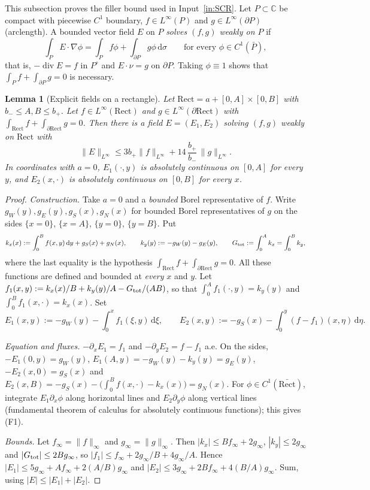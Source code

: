 \documentclass[11pt]{article}
\newtheorem{lemma}[theorem]{Lemma}
\theoremstyle{definition}
\theoremstyle{remark}
\newcommand{\C}{\mathbb C}
\newcommand{\dd}{\,\mathrm d}
\begin{document}
This subsection proves the filler bound used in Input~\ref{in:SCR}. Let $P\subset\C$ be compact
with piecewise $C^1$ boundary, $f\in L^\infty(P)$ and $g\in L^\infty(\partial P)$ (arclength). A
bounded vector field $E$ on $P$ \emph{solves $(f,g)$ weakly on $P$} if
\[
\int_PE\cdot\nabla\phi=\int_Pf\phi+\int_{\partial P}g\phi\dd\sigma\qquad\text{for every }\phi\in C^1(\bar P),
\tag{F1}
\]
that is, $-\operatorname{div}E=f$ in $P^\circ$ and $E\cdot\nu=g$ on $\partial P$. Taking $\phi\equiv1$
shows that $\int_Pf+\int_{\partial P}g=0$ is necessary.

\begin{lemma}[Explicit fields on a rectangle]\label{lem:rectfield}
Let $\mathrm{Rect}=a+[0,A]\times[0,B]$ with $b_-\le A,B\le b_+$. Let $f\in L^\infty(\mathrm{Rect})$ and
$g\in L^\infty(\partial\mathrm{Rect})$ with $\int_{\mathrm{Rect}}f+\int_{\partial\mathrm{Rect}}g=0$. Then there is a field
$E=(E_1,E_2)$ solving $(f,g)$ weakly on $\mathrm{Rect}$ with
\[
\|E\|_{L^\infty}\le3b_+\|f\|_{L^\infty}+14\,\frac{b_+}{b_-}\,\|g\|_{L^\infty}.
\]
In coordinates with $a=0$, $E_1(\cdot,y)$ is absolutely continuous on $[0,A]$ for every $y$, and
$E_2(x,\cdot)$ is absolutely continuous on $[0,B]$ for every $x$.
\end{lemma}
\begin{proof}
\emph{Construction.} Take $a=0$ and a \emph{bounded} Borel representative of $f$. Write
$g_W(y),g_E(y),g_S(x),g_N(x)$ for bounded Borel representatives of $g$ on the sides $\{x=0\}$,
$\{x=A\}$, $\{y=0\}$, $\{y=B\}$. Put
\[
k_x(x):=\int_0^Bf(x,y)\dd y+g_S(x)+g_N(x),\qquad k_y(y):=-g_W(y)-g_E(y),\qquad
G_{\rm tot}:=\int_0^Ak_x=\int_0^Bk_y ,
\]
where the last equality is the hypothesis $\int_{\mathrm{Rect}}f+\int_{\partial\mathrm{Rect}}g=0$. All these
functions are defined and bounded at \emph{every} $x$ and $y$. Let
$f_1(x,y):=k_x(x)/B+k_y(y)/A-G_{\rm tot}/(AB)$, so that $\int_0^Af_1(\cdot,y)=k_y(y)$ and
$\int_0^Bf_1(x,\cdot)=k_x(x)$. Set
\[
E_1(x,y):=-g_W(y)-\int_0^xf_1(\xi,y)\dd\xi,\qquad
E_2(x,y):=-g_S(x)-\int_0^y(f-f_1)(x,\eta)\dd\eta .
\]

\emph{Equation and fluxes.} $-\partial_xE_1=f_1$ and $-\partial_yE_2=f-f_1$ a.e. On the sides,
$-E_1(0,y)=g_W(y)$, $E_1(A,y)=-g_W(y)-k_y(y)=g_E(y)$, $-E_2(x,0)=g_S(x)$ and
$E_2(x,B)=-g_S(x)-\bigl(\int_0^Bf(x,\cdot)-k_x(x)\bigr)=g_N(x)$. For $\phi\in C^1(\bar{\mathrm{Rect}})$,
integrate $E_1\partial_x\phi$ along horizontal lines and $E_2\partial_y\phi$ along vertical lines
(fundamental theorem of calculus for absolutely continuous functions); this gives (F1).

\emph{Bounds.} Let $f_\infty=\|f\|_\infty$ and $g_\infty=\|g\|_\infty$. Then $|k_x|\le Bf_\infty+2g_\infty$,
$|k_y|\le2g_\infty$ and $|G_{\rm tot}|\le2Bg_\infty$, so $|f_1|\le f_\infty+2g_\infty/B+4g_\infty/A$. Hence
$|E_1|\le5g_\infty+Af_\infty+2(A/B)g_\infty$ and $|E_2|\le3g_\infty+2Bf_\infty+4(B/A)g_\infty$. Sum,
using $|E|\le|E_1|+|E_2|$.
\end{proof}
\end{document}
